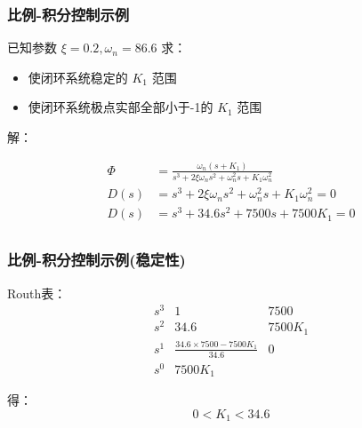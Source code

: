\documentclass{article}
\begin{document}
\begin{frame}
\frametitle{比例-积分控制示例}
\label{sec-4-3-2}


已知参数 $\xi=0.2,\omega_n=86.6$ 求：
\begin{itemize}
\item 使闭环系统稳定的 $K_1$ 范围
\item 使闭环系统极点实部全部小于-1的 $K_1$ 范围
\end{itemize}

解：

\begin{align*}
\Phi &=\frac{\omega_n(s+K_1)}{s^3+2\xi\omega_n s^2+\omega_n^2s+K_1\omega_n^2} \\
D(s) &=s^3+2\xi\omega_n s^2+\omega_n^2s+K_1\omega_n^2=0\\
D(s) &=s^3+ 34.6 s^2 + 7500 s + 7500 K_1=0\\
\end{align*}
\end{frame}
\begin{frame}
\frametitle{比例-积分控制示例(稳定性)}
\label{sec-4-3-3}

Routh表：
\[
\begin{matrix}
s^3 & 1    & 7500 \\
s^2 & 34.6 & 7500K_1 \\
s^1 & \frac{34.6\times 7500-7500K_1}{34.6} & 0 \\
s^0 & 7500K_1 
\end{matrix}
\]

得：
\[
0<K_1<34.6
\]
\end{frame}
\end{document}
